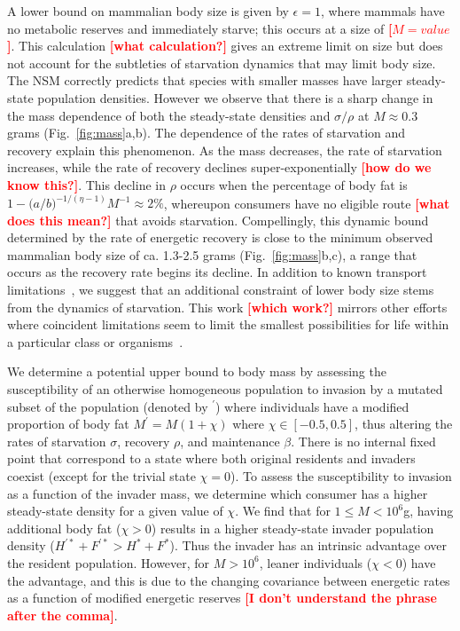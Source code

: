 \documentclass{pnastwo}
\newcommand{\sid}[1]{\textcolor{red}{\bf [#1]}}
\begin{document}
\begin{article}
A lower bound on mammalian body size is given by $\epsilon=1$, where mammals
have no metabolic reserves and immediately starve; this occurs at a size of
\sid{$M=value$}.  This calculation \sid{what calculation?} gives an extreme
limit on size but does not account for the subtleties of starvation dynamics
that may limit body size. The NSM correctly predicts that species with
smaller masses have larger steady-state population densities.  However we
observe that there is a sharp change in the mass dependence of both the
steady-state densities and $\sigma/\rho$ at $M \approx 0.3$ grams
(Fig.~\ref{fig:mass}a,b).  The dependence of the rates of starvation and
recovery explain this phenomenon.  As the mass decreases, the rate of
starvation increases, while the rate of recovery declines super-exponentially
\sid{how do we know this?}.  This decline in $\rho$ occurs when the
percentage of body fat is
$1 - \big(a/b\big)^{-1/\left(\eta-1\right)}M^{-1} \approx
2\%$,
whereupon consumers have no eligible route \sid{what does this mean?} that avoids
starvation.  Compellingly, this dynamic bound determined by the rate of
energetic recovery is close to the minimum observed mammalian body size of
ca. 1.3-2.5 grams (Fig.~\ref{fig:mass}b,c), a range that occurs as the
recovery rate begins its decline.  In addition to known transport
limitations~\cite{West:2002ud}, we suggest that an additional constraint of
lower body size stems from the dynamics of starvation.  This work \sid{which
  work?} mirrors other efforts where coincident limitations seem to limit the
smallest possibilities for life within a particular class or
organisms~\cite{Kempes:2012hy}.

We determine a potential upper bound to body mass by assessing the
susceptibility of an otherwise homogeneous population to invasion by a
mutated subset of the population (denoted by ${}^\prime$) where individuals
have a modified proportion of body fat $M^\prime=M(1+\chi)$ where
$\chi \in [-0.5,0.5]$, thus altering the rates of starvation $\sigma$,
recovery $\rho$, and maintenance $\beta$.  There is no internal fixed point
that correspond to a state where both original residents and invaders coexist
(except for the trivial state $\chi=0$).  To assess the susceptibility to
invasion as a function of the invader mass, we determine which consumer has a
higher steady-state density for a given value of $\chi$.  We find that for
$1\leq M<10^6$g, having additional body fat ($\chi > 0$) results in a higher
steady-state invader population density
($H^{\prime *}+F^{\prime *}>H^*+F^*$).  Thus the invader has an intrinsic
advantage over the resident population.  However, for $M>10^6$, leaner
individuals ($\chi < 0$) have the advantage, and this is due to the changing
covariance between energetic rates as a function of modified energetic
reserves \sid{I don't understand the phrase after the comma}.


\end{article}
\end{document}
